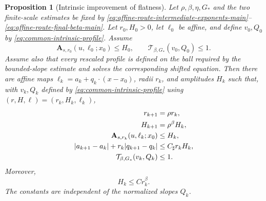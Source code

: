 \documentclass[11pt,reqno]{amsart}
\numberwithin{equation}{section}
\newtheorem{proposition}[theorem]{Proposition}
\theoremstyle{remark}
\begin{document}
\begin{proposition}[Intrinsic improvement of flatness]
\label{prop:unified-variable-block-recursion}
Let \(\rho,\beta,\eta,G_*\) and the two finite-scale estimates be fixed by
\eqref{eq:affine-route-intermediate-exponents-main}--\eqref{eq:affine-route-final-beta-main}.
Let \(r_0,H_0>0\), let \(\ell_0\) be affine, and define \(v_0,Q_0\) by
\eqref{eq:common-intrinsic-profile}.  Assume
\begin{equation*}
 \mathbf A_{s,r_0}(u,\ell_0;x_0)\le H_0,\qquad
 \mathcal T_{\beta,G_*}(v_0,Q_0)\le1.
\end{equation*}
Assume also that every rescaled profile is defined on the ball required
by the bounded-slope estimate and solves the corresponding shifted equation.
Then there are affine maps
\(\ell_k=a_k+q_k\cdot(x-x_0)\), radii \(r_k\), and amplitudes \(H_k\)
such that, with \(v_k,Q_k\) defined by
\eqref{eq:common-intrinsic-profile} using
\((r,H,\ell)=(r_k,H_k,\ell_k)\),
\begin{align}
 r_{k+1}&=\rho r_k,
 \notag\\
 H_{k+1}&=\rho^\beta H_k,
 \label{eq:unified-amplitude-recursion}\\
 \mathbf A_{s,r_k}(u,\ell_k;x_0)&\le H_k,
 \label{eq:unified-physical-amplitude}\\
 |a_{k+1}-a_k|+r_k|q_{k+1}-q_k|
 &\le C_\sharp r_kH_k,
 \label{eq:unified-affine-increments}\\
 \mathcal T_{\beta,G_*}(v_k,Q_k)&\le1.
 \label{eq:unified-tail-invariant}
\end{align}
Moreover,
\begin{equation}
 H_k\le C r_k^{\beta}.
 \label{eq:unified-amplitude-decay}
\end{equation}
The constants are independent of the normalized slopes \(Q_k\).
\end{proposition}
\end{document}
